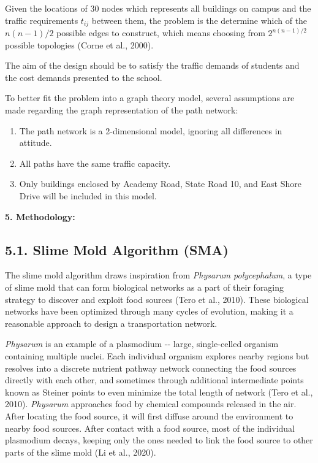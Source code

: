 \documentclass[11pt]{article}
\begin{document}
Given the locations of 30 nodes which represents all buildings on campus
and the traffic requirements \(t_{ij}\) between them, the problem is the
determine which of the \(n(n - 1)\text{/}2\) possible edges to
construct, which means choosing from \(2^{n(n - 1)\text{/}2}\) possible
topologies (Corne et al., 2000).

The aim of the design should be to satisfy the traffic demands of
students and the cost demands presented to the school.

To better fit the problem into a graph theory model, several assumptions
are made regarding the graph representation of the path network:

\begin{enumerate}
\def\labelenumi{\arabic{enumi}.}
\item
  The path network is a 2-dimensional model, ignoring all differences in
  attitude.
\item
  All paths have the same traffic capacity.
\item
  Only buildings enclosed by Academy Road, State Road 10, and East Shore
  Drive will be included in this model.
\end{enumerate}

\textbf{5. Methodology:}

\subsection{5.1. Slime Mold Algorithm (SMA)}

The slime mold algorithm draws inspiration from \emph{Physarum
polycephalum}, a type of slime mold that can form biological networks as
a part of their foraging strategy to discover and exploit food sources
(Tero et al., 2010). These biological networks have been optimized
through many cycles of evolution, making it a reasonable approach to
design a transportation network.

\emph{Physarum} is an example of a plasmodium -\/- large, single-celled
organism containing multiple nuclei. Each individual organism explores
nearby regions but resolves into a discrete nutrient pathway network
connecting the food sources directly with each other, and sometimes
through additional intermediate points known as Steiner points to even
minimize the total length of network (Tero et al., 2010).
\emph{Physarum} approaches food by chemical compounds released in the
air. After locating the food source, it will first diffuse around the
environment to nearby food sources. After contact with a food source,
most of the individual plasmodium decays, keeping only the ones needed
to link the food source to other parts of the slime mold (Li et al.,
2020).
\end{document}
